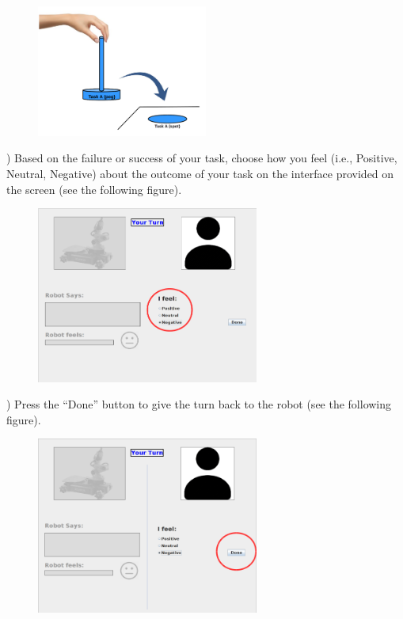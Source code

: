 \documentclass[12pt]{report}
\begin{document}
\begin{appendices}
\begin{figure}[tbh]
 \centering
 \includegraphics[width=0.5\textwidth]{figure/TaskExecution.png}
\end{figure}

) Based on the failure or success of your task, choose how you feel
(i.e., Positive, Neutral, Negative) about the outcome of your task on the
interface provided on the screen (see the following figure).

\begin{figure}[tbh]
 \centering
 \includegraphics[width=0.65\textwidth]{figure/stepB.png}
\end{figure}

) Press the “Done” button to give the turn back to the robot (see
the following figure).

\begin{figure}[tbh]
 \centering
 \includegraphics[width=0.65\textwidth]{figure/stepC.png}
\end{figure}


\end{appendices}
\end{document}
